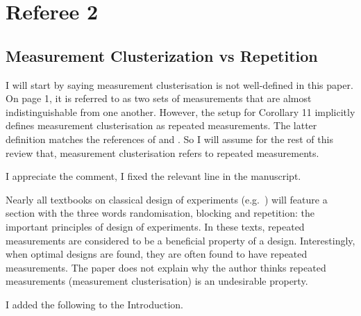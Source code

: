 \section{Referee 2}\label{ref2}
\subsection{Measurement Clusterization vs Repetition}
\RC I will start by saying measurement clusterisation is not
well-defined in this paper. On page 1, it is referred to as two sets
of measurements that are almost indistinguishable from one
another. However, the setup for Corollary 11 implicitly defines
measurement clusterisation as repeated measurements. The latter
definition matches the references of \cite{fedorov1996} and
\cite{nyberg2012}. So I will assume for the rest of this review that,
measurement clusterisation refers to repeated measurements.

\AR I appreciate the comment, I fixed the relevant line in the
manuscript.


\RC Nearly all textbooks on classical design of experiments
(e.g.~\cite[Section 1.2.4]{morris2011}) will feature a section with
the three words randomisation, blocking and repetition: the important
principles of design of experiments.  In these texts, repeated
measurements are considered to be a beneficial property of a
design. Interestingly, when optimal designs are found, they are often
found to have repeated measurements. The paper does not explain why
the author thinks repeated measurements (measurement clusterisation)
is an undesirable property.

\AR\label{rep} I added the following to the Introduction.

